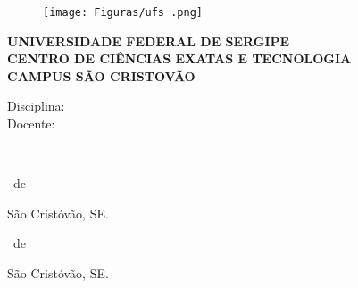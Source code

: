 
\begin{titlepage}
	\begin{center}
	
	\begin{figure}[!htb]
	\centering
	\texttt{[image: Figuras/ufs .png]}
	\end{figure}


		\large{\bf UNIVERSIDADE FEDERAL DE SERGIPE \\ CENTRO DE CIÊNCIAS EXATAS E TECNOLOGIA \\ CAMPUS SÃO CRISTOVÃO}\\
		\vspace{40pt}
 
        Disciplina: \disciplina \\
        Docente: \prof 
	\vspace{40pt}
	
        \textbf{\LARGE{\tema}}\\
			\vspace{60pt}
		\alunos

	\vfill
		
		
	\end{center}
	

	\vspace{0.2 cm}
	
	\begin{center}
		\vspace{\fill}
 \mes \ de  \ano

	São Cristóvão, SE.
			\end{center}
\end{titlepage}

\newpage
\begin{titlepage}
    \begin{center}
       \alunos
   
        \vspace{80pt}
        \textbf{ \large \tema } 
             \vspace{140pt}
    \end{center}
    


\hfill \begin{minipage}[h]{6.8 cm}
\preambulo
\end{minipage}

\vfill 
\centering 
      \mes \ de  \ano

	São Cristóvão, SE.	 

    
    
\end{titlepage}


\newpage
